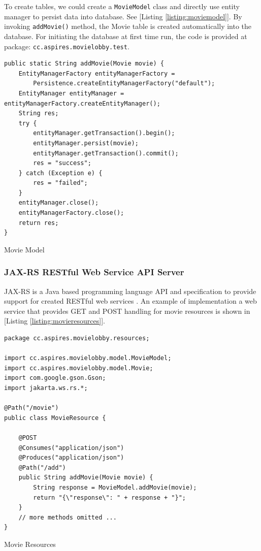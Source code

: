 \documentclass{article}
\begin{document}
To create tables, we could create a \verb|MovieModel| class and directly use entity manager to persist data into database. See [Listing \ref{listing:moviemodel}]. By invoking \verb|addMovie()| method, the Movie table is created automatically into the database. For initiating the database at first time run, the code is provided at package: \verb|cc.aspires.movielobby.test|.

\begin{listing}[!htp]
\begin{verbatim}
public static String addMovie(Movie movie) {
    EntityManagerFactory entityManagerFactory = 
        Persistence.createEntityManagerFactory("default");
    EntityManager entityManager = entityManagerFactory.createEntityManager();
    String res;
    try {
        entityManager.getTransaction().begin();
        entityManager.persist(movie);
        entityManager.getTransaction().commit();
        res = "success";
    } catch (Exception e) {
        res = "failed";
    }
    entityManager.close();
    entityManagerFactory.close();
    return res;
}
\end{verbatim}
\caption{Movie Model}
\label{listing:moviemodel}
\end{listing}

\subsubsection{JAX-RS RESTful Web Service API Server}

JAX-RS is a Java based programming language API and specification to provide support for created RESTful web services \cite{jaxrs}. An example of implementation a web service that provides GET and POST handling for movie resources is shown in [Listing \ref{listing:movieresources}].

\begin{listing}[!htp]
\begin{verbatim}
package cc.aspires.movielobby.resources;

import cc.aspires.movielobby.model.MovieModel;
import cc.aspires.movielobby.model.Movie;
import com.google.gson.Gson;
import jakarta.ws.rs.*;

@Path("/movie")
public class MovieResource {

    @POST
    @Consumes("application/json")
    @Produces("application/json")
    @Path("/add")
    public String addMovie(Movie movie) {
        String response = MovieModel.addMovie(movie);
        return "{\"response\": " + response + "}";
    }
    // more methods omitted ...
}
\end{verbatim}
\caption{Movie Resources}
\label{listing:movieresources}
\end{listing}
\end{document}
